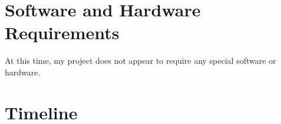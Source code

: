 \documentclass[12pt, a4paper]{article}
\begin{document}
%
\section*{Software and Hardware Requirements}
At this time, my project does not appear to require any special software or hardware.

\section*{Timeline}
\end{document}
